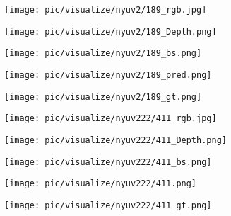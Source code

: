 \documentclass[lettersize,journal]{IEEEtran}
\begin{document}
\begin{figure*}[t]
    \centering
\begin{minipage}[c]{0.158\linewidth}
        \texttt{[image: pic/visualize/nyuv2/189\_rgb.jpg]}
    \end{minipage}
    \begin{minipage}[c]{0.158\linewidth}
        \texttt{[image: pic/visualize/nyuv2/189\_Depth.png]}
    \end{minipage} 
    \begin{minipage}[c]{0.158\linewidth}
        \texttt{[image: pic/visualize/nyuv2/189\_bs.png]}
    \end{minipage}
    \begin{minipage}[c]{0.158\linewidth}
        \texttt{[image: pic/visualize/nyuv2/189\_pred.png]}
    \end{minipage} 
    \begin{minipage}[c]{0.158\linewidth}
        \texttt{[image: pic/visualize/nyuv2/189\_gt.png]}
    \end{minipage} 


\begin{minipage}[c]{0.158\linewidth}
        \texttt{[image: pic/visualize/nyuv222/411\_rgb.jpg]}
    \end{minipage} 
    \begin{minipage}[c]{0.158\linewidth}
        \texttt{[image: pic/visualize/nyuv222/411\_Depth.png]}
    \end{minipage} 
    \begin{minipage}[c]{0.158\linewidth}
        \texttt{[image: pic/visualize/nyuv222/411\_bs.png]}
    \end{minipage} 
    \begin{minipage}[c]{0.158\linewidth}
        \texttt{[image: pic/visualize/nyuv222/411.png]}
    \end{minipage} 
    \begin{minipage}[c]{0.158\linewidth}
        \texttt{[image: pic/visualize/nyuv222/411\_gt.png]}
    \end{minipage}
    

\end{figure*}
\end{document}
